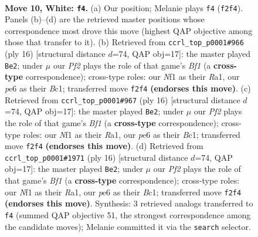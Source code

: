 \documentclass[11pt]{article}
\begin{document}
\clearpage

\begin{figure}[p]\centering
\begin{subfigure}{0.46\textwidth}\centering
\resizebox{\linewidth}{!}{%
\newchessgame
\chessboard[
  setfen={r1b1kb1r/pp1n1ppp/1q2p3/3pP3/3n4/8/PP2BPPP/R1BQKNNR w KQkq - 2 10},
  showmover=false,
  pgfstyle=straightmove, color=movearrow, markmove={f2-f4}
]}
\caption{}
\end{subfigure}\hfill
\begin{subfigure}{0.46\textwidth}\centering
\resizebox{\linewidth}{!}{%
\newchessgame
\chessboard[
  setfen={r1b1kb1r/pp3ppp/n3pn2/1N3q2/2P5/8/PP1N1PPP/R1BQKB1R w KQkq - 1 9},
  showmover=false,
  pgfstyle=straightmove, color=movearrow, markmove={f1-e2}
]}
\caption{}
\end{subfigure}
\\[4pt]
\begin{subfigure}{0.46\textwidth}\centering
\resizebox{\linewidth}{!}{%
\newchessgame
\chessboard[
  setfen={r1b1kb1r/pp3ppp/n3pn2/1N3q2/2P5/8/PP1N1PPP/R1BQKB1R w KQkq - 1 9},
  showmover=false,
  pgfstyle=straightmove, color=movearrow, markmove={f1-e2}
]}
\caption{}
\end{subfigure}\hfill
\begin{subfigure}{0.46\textwidth}\centering
\resizebox{\linewidth}{!}{%
\newchessgame
\chessboard[
  setfen={r1b1kb1r/pp3ppp/n3pn2/1N3q2/2P5/8/PP1N1PPP/R1BQKB1R w KQkq - 1 9},
  showmover=false,
  pgfstyle=straightmove, color=movearrow, markmove={f1-e2}
]}
\caption{}
\end{subfigure}
\caption{\textbf{Move 10, White: \texttt{f4}.} (a) Our position; Melanie plays \texttt{f4} (\texttt{f2f4}). Panels (b)--(d) are the retrieved master positions whose correspondence most drove this move (highest QAP objective among those that transfer to it). (b) Retrieved from \texttt{ccrl\_top\_p0001\#966} (ply 16) [structural distance $d$=74, QAP obj=17]: the master played \texttt{Be2}; under $\mu$ our \emph{Pf2} plays the role of that game's \emph{Bf1} (a \textbf{cross-type} correspondence); cross-type roles: our \emph{N}f1 as their \emph{R}a1, our \emph{p}e6 as their \emph{B}c1; transferred move \texttt{f2f4} \textbf{(endorses this move)}. (c) Retrieved from \texttt{ccrl\_top\_p0001\#967} (ply 16) [structural distance $d$=74, QAP obj=17]: the master played \texttt{Be2}; under $\mu$ our \emph{Pf2} plays the role of that game's \emph{Bf1} (a \textbf{cross-type} correspondence); cross-type roles: our \emph{N}f1 as their \emph{R}a1, our \emph{p}e6 as their \emph{B}c1; transferred move \texttt{f2f4} \textbf{(endorses this move)}. (d) Retrieved from \texttt{ccrl\_top\_p0001\#1971} (ply 16) [structural distance $d$=74, QAP obj=17]: the master played \texttt{Be2}; under $\mu$ our \emph{Pf2} plays the role of that game's \emph{Bf1} (a \textbf{cross-type} correspondence); cross-type roles: our \emph{N}f1 as their \emph{R}a1, our \emph{p}e6 as their \emph{B}c1; transferred move \texttt{f2f4} \textbf{(endorses this move)}. Synthesis: 3 retrieved analogs transferred to \texttt{f4} (summed QAP objective 51, the strongest correspondence among the candidate moves); Melanie committed it via the \texttt{search} selector.}
\label{fig:thought-m18}
\end{figure}
\end{document}
